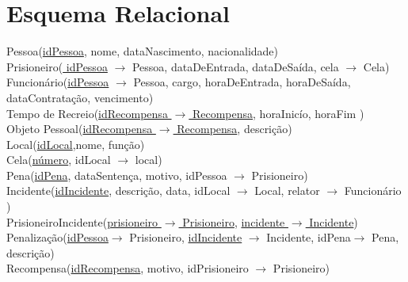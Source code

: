 \documentclass{article}
\begin{document}
\section{Esquema Relacional}
Pessoa(\underline{idPessoa}, nome, dataNascimento, nacionalidade)\\
Prisioneiro(\underline{ idPessoa} $\rightarrow$ Pessoa, dataDeEntrada, dataDeSaída, cela $\rightarrow$ Cela)\\
Funcionário(\underline{idPessoa} $\rightarrow$ Pessoa, cargo, horaDeEntrada, horaDeSaída, dataContratação, vencimento)\\
Tempo de Recreio(\underline{idRecompensa $\rightarrow$ Recompensa}, horaInicío, horaFim )\\
Objeto Pessoal(\underline{idRecompensa $\rightarrow$ Recompensa}, descrição)\\
Local(\underline{idLocal},nome, função)\\
Cela(\underline{número}, idLocal $\rightarrow$ local)\\
Pena(\underline{idPena}, dataSentença, motivo, idPessoa $\rightarrow$ Prisioneiro)\\
Incidente(\underline{idIncidente}, descrição, data, idLocal $\rightarrow$ Local, relator $\rightarrow$ Funcionário )\\
PrisioneiroIncidente(\underline{prisioneiro $\rightarrow$ Prisioneiro}, \underline{incidente $\rightarrow$ Incidente})\\
Penalização(\underline{idPessoa}$\rightarrow$ Prisioneiro, \underline{idIncidente} $\rightarrow$ Incidente, {idPena}$\rightarrow$ Pena, descrição)\\
Recompensa(\underline{idRecompensa}, motivo, idPrisioneiro $\rightarrow$ Prisioneiro)\\








	
\end{document}
